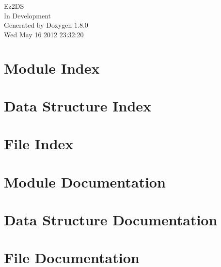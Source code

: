 \documentclass{book}
\begin{document}
\hypersetup{pageanchor=false,citecolor=blue}
\begin{titlepage}
\vspace*{7cm}
\begin{center}
{\Large Ez2\-D\-S \\[1ex]\large In Development }\\
\vspace*{1cm}
{\large Generated by Doxygen 1.8.0}\\
\vspace*{0.5cm}
{\small Wed May 16 2012 23:32:20}\\
\end{center}
\end{titlepage}
\clearemptydoublepage
{}
\tableofcontents
\clearemptydoublepage
{}
\hypersetup{pageanchor=true,citecolor=blue}
\chapter{Module Index}

\chapter{Data Structure Index}

\chapter{File Index}

\chapter{Module Documentation}







\chapter{Data Structure Documentation}













\chapter{File Documentation}








\printindex
\end{document}
